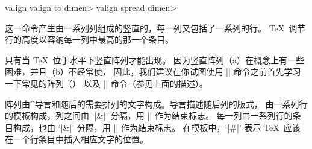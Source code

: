 \begindesc
{\tighten
\cts valign {{\bt {}}}
\aux\cts valign {{\bt to \<dimen>%
   }}
\aux\cts valign {{\bt spread \<dimen>%
   }}
\par}
\explain
这一命令产生由一系列列组成的竖直的，每一列又包括了一系列的行。
\TeX\ 调节行的高度以容纳每一列中最高的那一个条目。

只有当 \TeX\ 位于水平下竖直阵列才能出现。
因为竖直阵列（a）在概念上有一些困难，并且（b）不经常使，
因此，我们建议在你试图使用 |\valign| 命令之前首先学习一下常见的阵列（）%
以及 |\halign| 命令（参见上面的描述）。

阵列由^{导言}和随后的需要排列的文字构成。导言描述随后列的版式，
由一系列行的模板构成，列之间由 `|&|' 分隔，用 |\cr| 作为结束标志。
每一列由一系列行的条目构成，也由 `|&|' 分隔，用 |\cr| 作为结束标志。
在模板中，`|#|' 表示 \TeX\ 应该在一个行条目中插入相应文字的位置。

